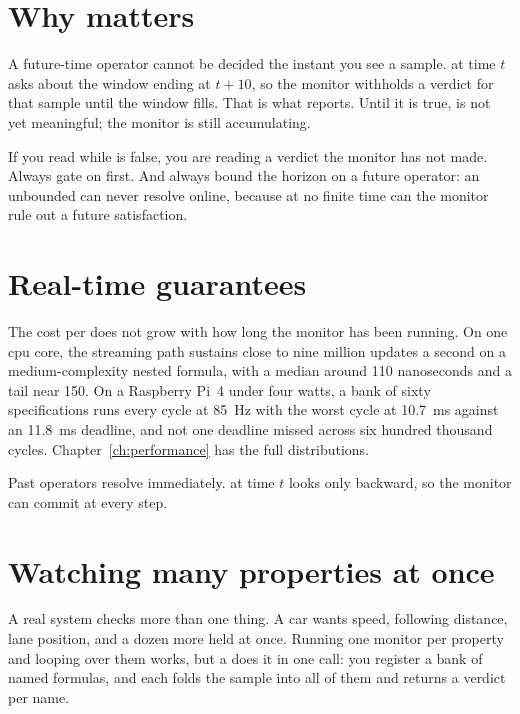 \section{Why  matters}

A future-time operator cannot be decided the instant you see a sample.  at time $t$ asks about the window ending at $t+10$, so the monitor withholds a verdict for that sample until the window fills. That is what  reports. Until it is true,  is not yet meaningful; the monitor is still accumulating.

\begin{pitfall}
If you read  while  is false, you are reading a verdict the monitor has not made. Always gate on  first. And always bound the horizon on a future operator: an unbounded  can never resolve online, because at no finite time can the monitor rule out a future satisfaction.
\end{pitfall}

\section{Real-time guarantees}

The cost per  does not grow with how long the monitor has been running. On one cpu core, the streaming path sustains close to nine million updates a second on a medium-complexity nested formula, with a median around 110 nanoseconds and a tail near 150. On a Raspberry Pi~4 under four watts, a bank of sixty specifications runs every cycle at 85~Hz with the worst cycle at 10.7~ms against an 11.8~ms deadline, and not one deadline missed across six hundred thousand cycles. Chapter~\ref{ch:performance} has the full distributions.

\begin{notebox}
Past operators resolve immediately.  at time $t$ looks only backward, so the monitor can commit at every step.
\end{notebox}

\section{Watching many properties at once}

A real system checks more than one thing. A car wants speed, following distance, lane position, and a dozen more held at once. Running one monitor per property and looping over them works, but a  does it in one call: you register a bank of named formulas, and each  folds the sample into all of them and returns a verdict per name.

